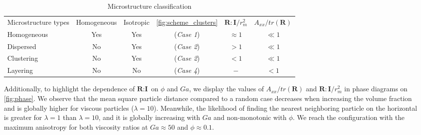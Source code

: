 \begin{table}[h!]
    \caption{Microstructure classification}
    \label{tab:microstructure}
    \centering
    \begin{tabular}{|lccccc|} \hline
        Microstructure types & Homogeneous & Isotropic & \ref{fig:scheme_clusters} & $\textbf{R}:\textbf{I}/r_m^2$ & $A_{xx}/tr(\textbf{R})$ \\
        Homogeneous & Yes & Yes &(\textit{Case 1}) & $ \approx 1$ & $\ll 1$ \\
        Dispersed &  No & Yes  &(\textit{Case 2}) & $ > 1$ & $\ll 1$ \\
        Clustering &  No & Yes  &(\textit{Case 2}) & $ < 1$ & $\ll 1$ \\
        Layering &    No & No  &(\textit{Case 4}) & $ - $ & $< 1$\\ \hline
    \end{tabular}
\end{table}
Additionally, to highlight the dependence of $\textbf{R}:\textbf{I}$ on $\phi$ and $Ga$, we display the values of $A_{xx}/tr(\textbf{R})$ and $\textbf{R}:\textbf{I}/r_m^2$ in phase diagrams on \ref{fig:phase}.
We observe that the mean square particle distance compared to a random case decreases when increasing the volume fraction and is globally higher for viscous particles ($\lambda = 10$).
Meanwhile, the likelihood of finding the nearest neighboring particle on the horizontal is greater for $\lambda=1$ than $\lambda = 10$, and it is globally increasing with  $Ga$ and non-monotonic with $\phi$. 
We reach the configuration with the maximum anisotropy for both viscosity ratios at $Ga \approx 50$ and $\phi \approx 0.1$. 

